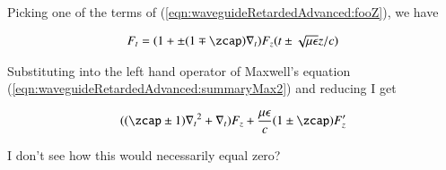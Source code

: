 Picking one of the terms of (\ref{eqn:waveguideRetardedAdvanced:fooZ}), we have

\begin{align*}
F_t = (1 + \pm (1 \mp \zcap) \grad_t) F_z(t \pm \sqrt{\mu\epsilon} z/c) 
\end{align*}

Substituting into the left hand operator of Maxwell's equation (\ref{eqn:waveguideRetardedAdvanced:summaryMax2}) and reducing I get

\begin{align*}
((\zcap \pm 1) {\grad_t}^2 + \grad_t) F_z + \frac{\mu\epsilon}{c}(1 \pm \zcap) F_z'
\end{align*}

I don't see how this would necessarily equal zero?

\EndArticle
